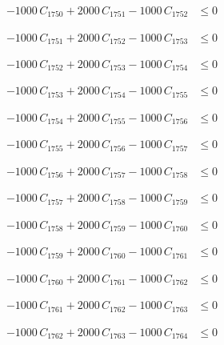 \documentclass[a4paper,11pt]{article}
\begin{document}
\begin{align}
-1000\,C_{1750} + 2000\,C_{1751} - 1000\,C_{1752} &\leq 0 \nonumber
\end{align}

\begin{align}
-1000\,C_{1751} + 2000\,C_{1752} - 1000\,C_{1753} &\leq 0 \nonumber
\end{align}

\begin{align}
-1000\,C_{1752} + 2000\,C_{1753} - 1000\,C_{1754} &\leq 0 \nonumber
\end{align}

\begin{align}
-1000\,C_{1753} + 2000\,C_{1754} - 1000\,C_{1755} &\leq 0 \nonumber
\end{align}

\begin{align}
-1000\,C_{1754} + 2000\,C_{1755} - 1000\,C_{1756} &\leq 0 \nonumber
\end{align}

\begin{align}
-1000\,C_{1755} + 2000\,C_{1756} - 1000\,C_{1757} &\leq 0 \nonumber
\end{align}

\begin{align}
-1000\,C_{1756} + 2000\,C_{1757} - 1000\,C_{1758} &\leq 0 \nonumber
\end{align}

\begin{align}
-1000\,C_{1757} + 2000\,C_{1758} - 1000\,C_{1759} &\leq 0 \nonumber
\end{align}

\begin{align}
-1000\,C_{1758} + 2000\,C_{1759} - 1000\,C_{1760} &\leq 0 \nonumber
\end{align}

\begin{align}
-1000\,C_{1759} + 2000\,C_{1760} - 1000\,C_{1761} &\leq 0 \nonumber
\end{align}

\begin{align}
-1000\,C_{1760} + 2000\,C_{1761} - 1000\,C_{1762} &\leq 0 \nonumber
\end{align}

\begin{align}
-1000\,C_{1761} + 2000\,C_{1762} - 1000\,C_{1763} &\leq 0 \nonumber
\end{align}

\begin{align}
-1000\,C_{1762} + 2000\,C_{1763} - 1000\,C_{1764} &\leq 0 \nonumber
\end{align}
\end{document}
